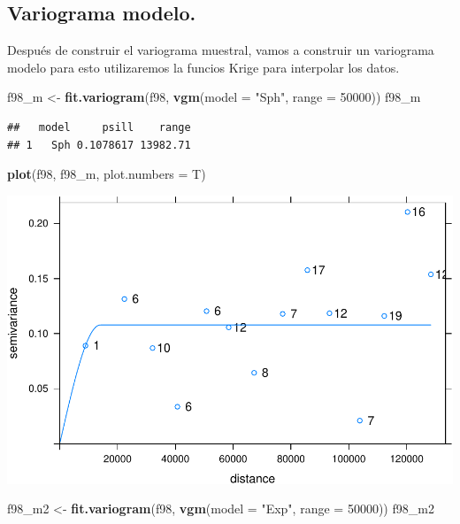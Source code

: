\documentclass[11pt,]{article}
\newenvironment{Shaded}{\begin{snugshade}}{\end{snugshade}}
\newcommand{\KeywordTok}[1]{\textcolor[rgb]{0.13,0.29,0.53}{\textbf{#1}}}
\newcommand{\DataTypeTok}[1]{\textcolor[rgb]{0.13,0.29,0.53}{#1}}
\newcommand{\DecValTok}[1]{\textcolor[rgb]{0.00,0.00,0.81}{#1}}
\newcommand{\StringTok}[1]{\textcolor[rgb]{0.31,0.60,0.02}{#1}}
\newcommand{\NormalTok}[1]{#1}
\begin{document}
\subsection{Variograma modelo.}\label{variograma-modelo.}

Después de construir el variograma muestral, vamos a construir un
variograma modelo para esto utilizaremos la funcios Krige para
interpolar los datos.

\begin{Shaded}
\begin{Highlighting}[]
\NormalTok{f98_m <-}\StringTok{ }\KeywordTok{fit.variogram}\NormalTok{(f98, }\KeywordTok{vgm}\NormalTok{(}\DataTypeTok{model =} \StringTok{"Sph"}\NormalTok{, }\DataTypeTok{range =} \DecValTok{50000}\NormalTok{))}
\NormalTok{f98_m}
\end{Highlighting}
\end{Shaded}

\begin{verbatim}
##   model     psill    range
## 1   Sph 0.1078617 13982.71
\end{verbatim}

\begin{Shaded}
\begin{Highlighting}[]
\KeywordTok{plot}\NormalTok{(f98, f98_m, }\DataTypeTok{plot.numbers =}\NormalTok{ T)}
\end{Highlighting}
\end{Shaded}

\includegraphics{proyecto_Superficie_Continua_files/figure-latex/unnamed-chunk-8-1.pdf}

\begin{Shaded}
\begin{Highlighting}[]
\NormalTok{f98_m2 <-}\StringTok{ }\KeywordTok{fit.variogram}\NormalTok{(f98, }\KeywordTok{vgm}\NormalTok{(}\DataTypeTok{model =} \StringTok{"Exp"}\NormalTok{, }\DataTypeTok{range =} \DecValTok{50000}\NormalTok{))}
\NormalTok{f98_m2}
\end{Highlighting}
\end{Shaded}
\end{document}
